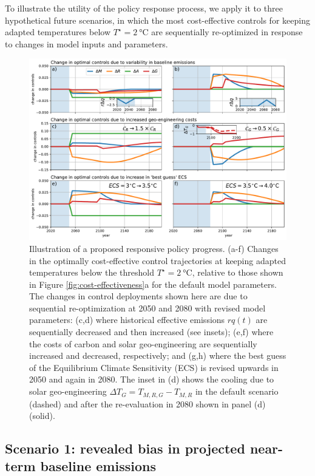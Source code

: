 \documentclass[9pt,twocolumn,twoside,lineno]{pnas-new}
\begin{document}
To illustrate the utility of the policy response process, we apply it to three hypothetical future scenarios, in which the most cost-effective controls for keeping adapted temperatures below $T^{\star} = \SI{2}{\celsius}$ are sequentially re-optimized in response to changes in model inputs and parameters.

\begin{figure}%
\centering
\includegraphics[width=11.4cm]{figures/policy_updates.pdf}
\caption{Illustration of a proposed responsive policy progress. (a-f) Changes in the optimally cost-effective control trajectories at keeping adapted temperatures below the threshold $T^{\star} = \SI{2}{\celsius}$, relative to those shown in Figure \ref{fig:cost-effectiveness}a for the default model parameters. The changes in control deployments shown here are due to sequential re-optimization at 2050 and 2080 with revised model parameters: (c,d) where historical effective emissions $rq(t)$ are sequentially decreased and then increased (see insets); (e,f) where the costs of carbon and solar geo-engineering are sequentially increased and decreased, respectively; and (g,h) where the best guess of the Equilibrium Climate Sensitivity (ECS) is revised upwards in 2050 and again in 2080. The inset in (d) shows the cooling due to solar geo-engineering $\Delta T_{G} = T_{M,R,G} - T_{M,R}$ in the default scenario (dashed) and after the re-evaluation in 2080 shown in panel (d) (solid).}
\label{fig:policy-updates}
\end{figure}

\subsection*{Scenario 1: revealed bias in projected near-term baseline emissions}
\end{document}
